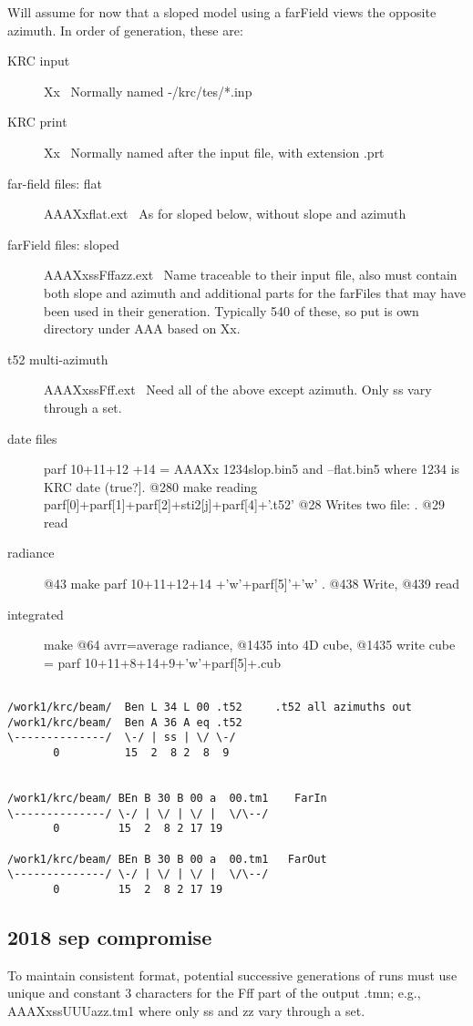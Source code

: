 \documentclass{article}
\begin{document}
 Will assume for now that a sloped model using a farField views the opposite
 azimuth.  In order of generation, these are:
\begin{description}  %
\item [KRC input] Xx \ Normally named  -/krc/tes/*.inp 
\item [KRC print] Xx \ Normally named after the input file, with extension .prt 
\item [far-field files: flat] AAAXxflat.ext \ As for sloped below, without slope and azimuth
\item [farField files: sloped] AAAXxssFffazz.ext  \ Name traceable to their input file, also must contain both slope and azimuth and additional parts for the farFiles that may have been used in their generation.  Typically 540 of these, so put is own directory under AAA based on Xx.   
\item [t52 multi-azimuth] AAAXxssFff.ext \ Need all of the above except azimuth. Only ss vary through a set. 
\item [date files] parf 10+11+12 +14 = AAAXx 1234slop.bin5 and --flat.bin5 where 1234 is KRC  date (true?].  
\qi @280 make reading parf[0]+parf[1]+parf[2]+sti2[j]+parf[4]+'.t52'
\qi  @28 Writes two file: .  @29 read
\item [radiance]   @43 make parf 10+11+12+14 +'w'+parf[5]'+'w' .    @438 Write, @439 read
\item [integrated]  make @64 avrr=average radiance, @1435 into 4D cube, @1435 write cube =  parf 10+11+8+14+9+'w'+parf[5]+.cub 
 \end{description}
\begin{verbatim}

/work1/krc/beam/  Ben L 34 L 00 .t52     .t52 all azimuths out
/work1/krc/beam/  Ben A 36 A eq .t52
\--------------/  \-/ | ss | \/ \-/
       0          15  2  8 2  8  9   


/work1/krc/beam/ BEn B 30 B 00 a  00.tm1    FarIn
\--------------/ \-/ | \/ | \/ |  \/\--/
       0         15  2  8 2 17 19   

/work1/krc/beam/ BEn B 30 B 00 a  00.tm1   FarOut
\--------------/ \-/ | \/ | \/ |  \/\--/
       0         15  2  8 2 17 19   

\end{verbatim}    
\subsection{2018 sep compromise}

To maintain consistent format, potential successive generations of runs must use
unique and constant 3 characters for the Fff part of the output .tmn; e.g.,
AAAXxssUUUazz.tm1 where only ss and zz vary through a set.
\end{document}
